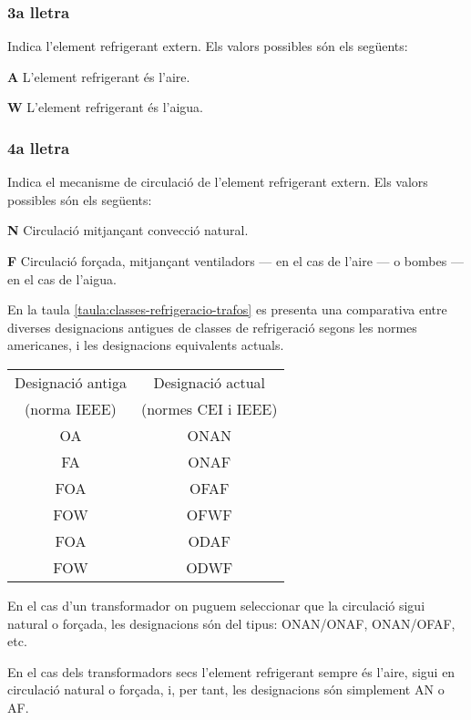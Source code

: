 \subsubsection*{3a lletra}
 Indica l'element refrigerant extern. Els valors
possibles són els següents:

\begin{list}{}
   {\setlength{\labelwidth}{10mm} \setlength{\leftmargin}{10mm} \setlength{\labelsep}{2mm}}
   \item[\textbf{A}] L'element refrigerant és l'aire.
   \item[\textbf{W}] L'element refrigerant és l'aigua.
\end{list}
 

\subsubsection*{4a lletra}
 Indica el mecanisme de circulació de l'element
refrigerant extern. Els valors possibles són els següents:
\begin{list}{}
   {\setlength{\labelwidth}{10mm} \setlength{\leftmargin}{10mm} \setlength{\labelsep}{2mm}}
   \item[\textbf{N}] Circulació mitjançant convecció natural.
   \item[\textbf{F}] Circulació forçada, mitjançant ventiladors --- en el cas de
   l'aire --- o bombes --- en el cas de l'aigua.
\end{list}
 

En la taula \vref{taula:classes-refrigeracio-trafos} es presenta una
comparativa entre diverses designacions antigues de classes de
refrigeració segons les normes americanes, i les designacions
equivalents actuals.

\begin{center}
   \label{taula:classes-refrigeracio-trafos}
   \begin{tabular}{cc}
   \toprule[1pt]
   Designació antiga & Designació actual \\
   (norma IEEE)     & (normes CEI i IEEE) \\
   \midrule
   OA & ONAN   \\
   FA & ONAF   \\
   FOA & OFAF  \\
   FOW & OFWF  \\
   FOA & ODAF  \\
   FOW & ODWF \\
   \bottomrule[1pt]
   \end{tabular}
\end{center}

En el cas d'un transformador on puguem seleccionar que la circulació
sigui natural o forçada,
les designacions són del tipus: ONAN/ONAF, ONAN/OFAF, etc.

En el cas dels transformadors secs l'element refrigerant sempre és
l'aire, sigui en circulació natural o forçada, i, per tant, les
designacions són simplement AN o AF.

